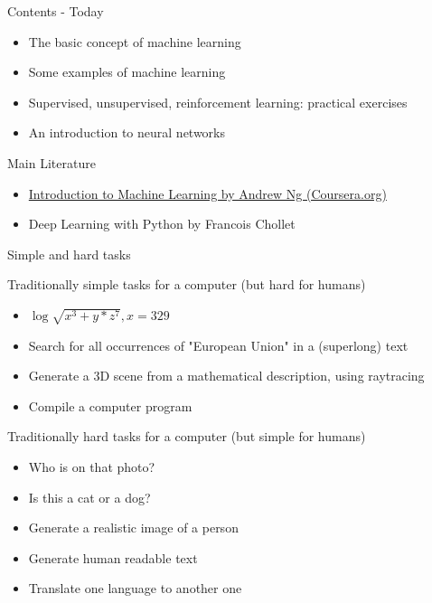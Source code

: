 \documentclass[color=usenames,dvipsnames]{beamer}
\begin{document}
\begin{frame}{Contents - Today} 

\begin{itemize}
\item The basic concept of machine learning
\item Some examples of machine learning
\item Supervised, unsupervised, reinforcement learning: practical exercises

\item An introduction to neural networks 

\end{itemize}

\end{frame}

\begin{frame}{Main Literature}

\begin{itemize}
\item \href{https://www.coursera.org/learn/machine-learning}{{Introduction to Machine Learning by Andrew Ng (Coursera.org)}}
\item Deep Learning with Python by Francois Chollet
\end{itemize}

\end{frame}





\begin{frame}{Simple and hard tasks} 

Traditionally simple tasks for a computer (but hard for humans)

\begin{itemize}
	\item $\log{\sqrt{x^3+y*z^7}},x = 329$
	\item Search for all occurrences of "European Union" in a (superlong) text
	\item Generate a 3D scene from a mathematical description, using raytracing
	\item Compile a computer program	
\end{itemize}	

Traditionally hard tasks for a computer (but simple for humans)
\begin{itemize}
	\item Who is on that photo?
	\item Is this a cat or a dog?
	\item Generate a realistic image of a person
	\item Generate human readable text
	\item Translate one language to another one		
\end{itemize}	

\end{frame}
\end{document}
